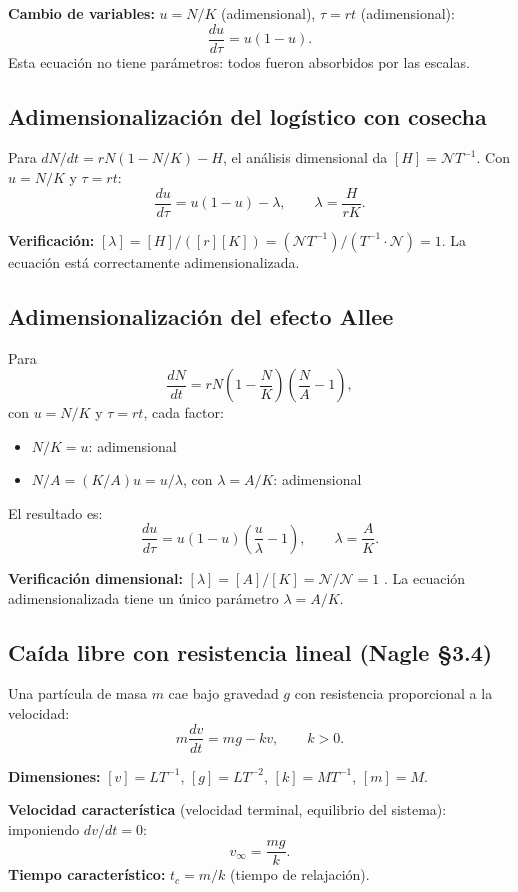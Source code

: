 \documentclass[11pt,letterpaper]{article}
\begin{document}
\textbf{Cambio de variables:} $u=N/K$ (adimensional), $\tau=rt$ (adimensional):
\[
\frac{du}{d\tau}=u(1-u).
\]
Esta ecuación no tiene parámetros: todos fueron absorbidos por las escalas.

\subsection{Adimensionalización del logístico con cosecha}

Para $dN/dt=rN(1-N/K)-H$, el análisis dimensional da $[H]=\mathcal{N}T^{-1}$.
Con $u=N/K$ y $\tau=rt$:
\[
\frac{du}{d\tau}=u(1-u)-\lambda,\qquad \lambda=\frac{H}{rK}.
\]

\textbf{Verificación:} $[\lambda]=[H]/([r][K])=(\mathcal{N}T^{-1})/(T^{-1}\cdot\mathcal{N})=1$.
La ecuación está correctamente adimensionalizada.

\subsection{Adimensionalización del efecto Allee}

Para
\[
\frac{dN}{dt}=rN\!\left(1-\frac{N}{K}\right)\!\left(\frac{N}{A}-1\right),
\]
con $u=N/K$ y $\tau=rt$, cada factor:
\begin{itemize}
    \item $N/K=u$: adimensional \checkmark
    \item $N/A=(K/A)u=u/\lambda$, con $\lambda=A/K$: adimensional \checkmark
\end{itemize}
El resultado es:
\[
\frac{du}{d\tau}=u(1-u)\!\left(\frac{u}{\lambda}-1\right),
\qquad \lambda=\frac{A}{K}.
\]

\textbf{Verificación dimensional:} $[\lambda]=[A]/[K]=\mathcal{N}/\mathcal{N}=1$ \checkmark.
La ecuación adimensionalizada tiene un único parámetro $\lambda=A/K$.

\subsection{Caída libre con resistencia lineal (Nagle §3.4)}

Una partícula de masa $m$ cae bajo gravedad $g$ con resistencia proporcional
a la velocidad:
\[
m\frac{dv}{dt}=mg-kv,\qquad k>0.
\]

\textbf{Dimensiones:} $[v]=LT^{-1}$, $[g]=LT^{-2}$, $[k]=MT^{-1}$,
$[m]=M$.

\textbf{Velocidad característica} (velocidad terminal, equilibrio del sistema):
imponiendo $dv/dt=0$:
\[
v_\infty=\frac{mg}{k}.
\]
\textbf{Tiempo característico:} $t_c=m/k$ (tiempo de relajación).
\end{document}
